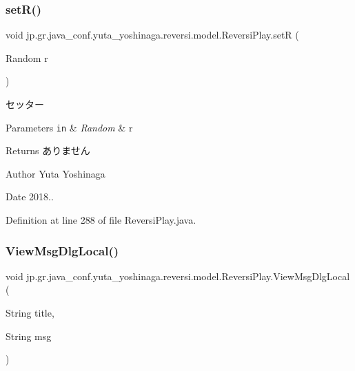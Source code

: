 \subsubsection{\texorpdfstring{set\+R()}{setR()}}
{\footnotesize\ttfamily void jp.\+gr.\+java\+\_\+conf.\+yuta\+\_\+yoshinaga.\+reversi.\+model.\+Reversi\+Play.\+setR (\begin{DoxyParamCaption}\item[{Random}]{r }\end{DoxyParamCaption})}



セッター 


\begin{DoxyParams}[1]{Parameters}
\mbox{\tt in}  & {\em Random} & r \\
\hline
\end{DoxyParams}
\begin{DoxyReturn}{Returns}
ありません 
\end{DoxyReturn}
\begin{DoxyAuthor}{Author}
Yuta Yoshinaga 
\end{DoxyAuthor}
\begin{DoxyDate}{Date}
2018.. 
\end{DoxyDate}


Definition at line 288 of file Reversi\+Play.\+java.

\mbox{\label{classjp_1_1gr_1_1java__conf_1_1yuta__yoshinaga_1_1reversi_1_1model_1_1_reversi_play_ae673231f92f3bd36a43acbc713a97513}} 
\subsubsection{\texorpdfstring{View\+Msg\+Dlg\+Local()}{ViewMsgDlgLocal()}}
{\footnotesize\ttfamily void jp.\+gr.\+java\+\_\+conf.\+yuta\+\_\+yoshinaga.\+reversi.\+model.\+Reversi\+Play.\+View\+Msg\+Dlg\+Local (\begin{DoxyParamCaption}\item[{String}]{title,  }\item[{String}]{msg }\end{DoxyParamCaption})\hspace{0.3cm}{\ttfamily [private]}}



